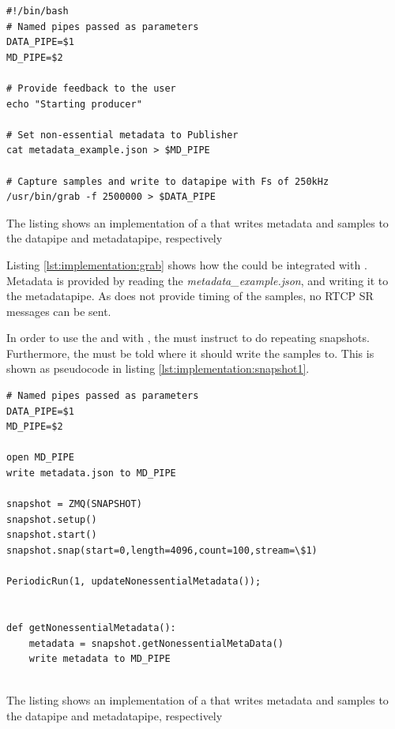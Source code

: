\begin{listing}[H] 
\begin{verbatim}
#!/bin/bash
# Named pipes passed as parameters
DATA_PIPE=$1
MD_PIPE=$2

# Provide feedback to the user
echo "Starting producer"

# Set non-essential metadata to Publisher
cat metadata_example.json > $MD_PIPE

# Capture samples and write to datapipe with Fs of 250kHz
/usr/bin/grab -f 2500000 > $DATA_PIPE
\end{verbatim}
\caption{The listing shows an implementation of a \pro{} that writes metadata and samples to the datapipe and metadatapipe, respectively}
\label{lst:implementation:grab}
\end{listing}

\noindent{}Listing \ref{lst:implementation:grab} shows how the \pro{} could be integrated with .
Metadata is provided by reading the \textit{metadata\_example.json}, and writing it to the metadatapipe.
As  does not provide timing of the samples, no RTCP SR messages can be sent.


In order to use the \pub{} and \con{} with , the \pro{} must instruct  to do repeating snapshots. Furthermore, the  must be told where it should write the samples to. This is shown as pseudocode in listing \ref{lst:implementation:snapshot1}.

\begin{listing}[H] 
\begin{verbatim}
# Named pipes passed as parameters
DATA_PIPE=$1
MD_PIPE=$2

open MD_PIPE
write metadata.json to MD_PIPE

snapshot = ZMQ(SNAPSHOT)
snapshot.setup()
snapshot.start()
snapshot.snap(start=0,length=4096,count=100,stream=\$1)

PeriodicRun(1, updateNonessentialMetadata());


def getNonessentialMetadata():
	metadata = snapshot.getNonessentialMetaData()
	write metadata to MD_PIPE
	
\end{verbatim}
\caption{The listing shows an implementation of a \pro{} that writes metadata and samples to the datapipe and metadatapipe, respectively}
\label{lst:implementation:snapshot1}
\end{listing}

